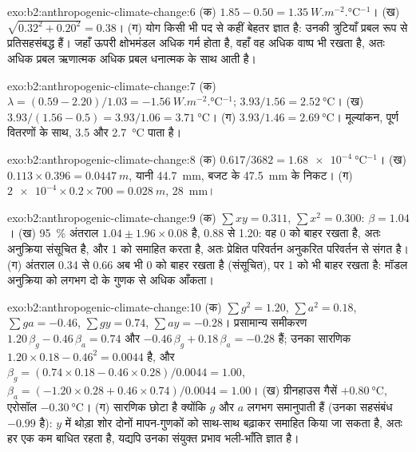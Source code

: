 \begin{solution}{exo:b2:anthropogenic-climate-change:6}
(क) $1.85 - 0.50 = \qty{1.35}{W.m^{-2}.\celsius^{-1}}$। (ख) $\sqrt{0.32^2 + 0.20^2} = 0.38$।
(ग) योग किसी भी पद से कहीं बेहतर ज्ञात है: उनकी त्रुटियाँ प्रबल रूप से प्रतिसहसंबद्ध हैं। जहाँ
ऊपरी क्षोभमंडल अधिक गर्म होता है, वहाँ वह अधिक वाष्प भी रखता है, अतः अधिक प्रबल ऋणात्मक  अधिक प्रबल धनात्मक  के साथ आती है।
\end{solution}

\begin{solution}{exo:b2:anthropogenic-climate-change:7}
(क) $\lambda = (0.59 - 2.20)/1.03 = \qty{-1.56}{W.m^{-2}.\celsius^{-1}}$; $3.93/1.56 =
\qty{2.52}{\celsius}$। (ख) $3.93/(1.56 - 0.5) = 3.93/1.06 = \qty{3.71}{\celsius}$। (ग) $3.93/1.46 =
\qty{2.69}{\celsius}$। मूल्यांकन, पूर्ण वितरणों के साथ, 3.5 और \qty{2.7}{\celsius} पाता है।
\end{solution}

\begin{solution}{exo:b2:anthropogenic-climate-change:8}
(क) $0.617/3682 = \qty{1.68e-4}{\celsius^{-1}}$। (ख) $0.113 \times 0.396 = \qty{0.0447}{m}$, यानी
\qty{44.7}{mm}, बजट के \qty{47.5}{mm} के निकट। (ग) $\num{2e-4} \times 0.2 \times 700 =
\qty{0.028}{m}$, \qty{28}{mm}।
\end{solution}

\begin{solution}{exo:b2:anthropogenic-climate-change:9}
(क) $\sum xy = 0.311$, $\sum x^2 = 0.300$: $\beta = 1.04$। (ख) \qty{95}{\percent} अंतराल
$1.04 \pm 1.96 \times 0.08$ है, 0.88 से 1.20: वह 0 को बाहर रखता है, अतः अनुक्रिया संसूचित है, और
1 को समाहित करता है, अतः प्रेक्षित परिवर्तन अनुकरित परिवर्तन से संगत है। (ग) अंतराल 0.34 से 0.66 अब भी
0 को बाहर रखता है (संसूचित), पर 1 को भी बाहर रखता है: मॉडल अनुक्रिया को लगभग दो के गुणक से
अधिक आँकता।
\end{solution}

\begin{solution}{exo:b2:anthropogenic-climate-change:10}
(क) $\sum g^2 = 1.20$, $\sum a^2 = 0.18$, $\sum ga = -0.46$, $\sum gy = 0.74$, $\sum ay = -0.28$।
प्रसामान्य समीकरण $1.20\,\beta_g - 0.46\,\beta_a = 0.74$ और $-0.46\,\beta_g + 0.18\,\beta_a
= -0.28$ हैं; उनका सारणिक $1.20 \times 0.18 - 0.46^2 = 0.0044$ है, और $\beta_g = (0.74 \times
0.18 - 0.46 \times 0.28)/0.0044 = 1.00$, $\beta_a = (-1.20 \times 0.28 + 0.46 \times 0.74)/0.0044 =
1.00$। (ख) ग्रीनहाउस गैसें $+\qty{0.80}{\celsius}$, एरोसॉल $-\qty{0.30}{\celsius}$। (ग)
सारणिक छोटा है क्योंकि $g$ और $a$ लगभग समानुपाती हैं (उनका सहसंबंध $-0.99$ है): $y$ में थोड़ा
शोर दोनों मापन-गुणकों को साथ-साथ बढ़ाकर समाहित किया जा सकता है, अतः हर एक कम
बाधित रहता है, यद्यपि उनका संयुक्त प्रभाव भली-भाँति ज्ञात है।
\end{solution}

